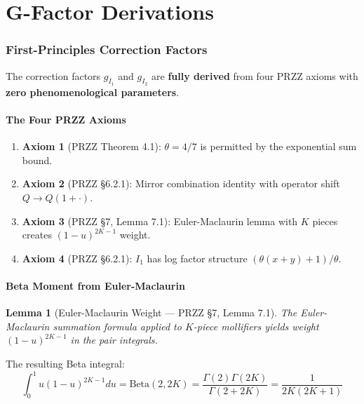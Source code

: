 \documentclass[11pt]{article}
\newtheorem{lemma}{Lemma}
\begin{document}

\part{G-Factor Derivations}

\section{First-Principles Correction Factors}
\label{sec:gfactors}

The correction factors $g_{I_1}$ and $g_{I_2}$ are \textbf{fully derived} from four PRZZ axioms with \textbf{zero phenomenological parameters}.

\subsection{The Four PRZZ Axioms}

\begin{enumerate}
\item \textbf{Axiom 1} (PRZZ Theorem 4.1): $\theta = 4/7$ is permitted by the exponential sum bound.
\item \textbf{Axiom 2} (PRZZ \S6.2.1): Mirror combination identity with operator shift $Q \to Q(1+\cdot)$.
\item \textbf{Axiom 3} (PRZZ \S7, Lemma 7.1): Euler-Maclaurin lemma with $K$ pieces creates $(1-u)^{2K-1}$ weight.
\item \textbf{Axiom 4} (PRZZ \S6.2.1): $I_1$ has log factor structure $(\theta(x+y)+1)/\theta$.
\end{enumerate}

\subsection{Beta Moment from Euler-Maclaurin}

\begin{lemma}[Euler-Maclaurin Weight --- PRZZ \S7, Lemma 7.1]
The Euler-Maclaurin summation formula applied to $K$-piece mollifiers yields weight $(1-u)^{2K-1}$ in the pair integrals.
\end{lemma}

The resulting Beta integral:
\begin{equation}
\int_0^1 u(1-u)^{2K-1} du = \text{Beta}(2, 2K) = \frac{\Gamma(2)\Gamma(2K)}{\Gamma(2+2K)} = \frac{1}{2K(2K+1)}
\end{equation}
\end{document}
